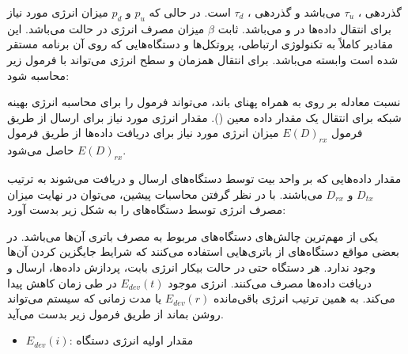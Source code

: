 گذردهی ، $\tau_u$ می‌باشد و گذردهی ، $\tau_d$ است. در
حالی که $p_u$ و $p_d$ میزان انرژی مورد نیاز برای انتقال داده‌ها در  و
 می‌باشد. ثابت $\beta$ میزان مصرف انرژی در حالت  می‌باشد.
این مقادیر کاملاً به تکنولوژی ارتباطی، پروتکل‌ها و دستگاه‌هایی که روی آن برنامه
مستقر شده است وابسته می‌‌باشد. برای انتقال همزمان  و 
سطح انرژی می‌تواند با فرمول زیر محاسبه شود:


نسبت معادله  بر روی  به همراه پهنای باند، می‌تواند فرمول
را برای محاسبه انرژی بهینه شبکه برای انتقال یک مقدار داده معین (). مقدار انرژی مورد نیاز برای ارسال از طریق فرمول $E(D)_{rx}$ میزان انرژی
مورد نیاز برای دریافت داده‌ها از طریق فرمول $E(D)_{rx}$ حاصل می‌شود.


مقدار داده‌هایی که بر واحد بیت توسط دستگاه‌های  ارسال و دریافت می‌شوند
به ترتیب $D_{tx}$ و $D_{rx}$ می‌باشند. با در نظر گرفتن محاسبات پیشین، می‌توان در
نهایت میزان مصرف انرژی توسط دستگاه‌های  را به شکل زیر بدست آورد:


یکی از مهم‌ترین چالش‌های دستگاه‌های  مربوط به مصرف باتری آن‌ها می‌باشد.
در بعضی مواقع دستگاه‌های  از باتری‌هایی استفاده می‌کنند که شرایط جایگزین
کردن آن‌ها وجود ندارد. هر دستگاه  حتی در حالت بیکار انرژی بابت، پردازش
داده‌ها، ارسال و دریافت داده‌ها مصرف می‌کنند. انرژی موجود $E_{dev}(t)$ در طی
زمان کاهش پیدا می‌کند. به همین ترتیب انرژی باقی‌مانده $E_{dev}(r)$ یا مدت زمانی
که سیستم می‌تواند روشن بماند از طریق فرمول زیر بدست می‌آید.


\begin{itemize}
    \item $E_{dev}(i)$: مقدار اولیه انرژی دستگاه
\end{itemize}

